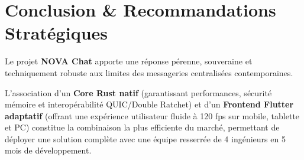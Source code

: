 \documentclass[11pt,a4paper]{article}
\begin{document}
\vspace{0.5cm}

\section{Conclusion \& Recommandations Stratégiques}

Le projet \textbf{NOVA Chat} apporte une réponse pérenne, souveraine et techniquement robuste aux limites des messageries centralisées contemporaines. 

L'association d'un \textbf{Core Rust natif} (garantissant performances, sécurité mémoire et interopérabilité QUIC/Double Ratchet) et d'un \textbf{Frontend Flutter adaptatif} (offrant une expérience utilisateur fluide à 120 fps sur mobile, tablette et PC) constitue la combinaison la plus efficiente du marché, permettant de déployer une solution complète avec une équipe resserrée de 4 ingénieurs en 5 mois de développement.
\end{document}
